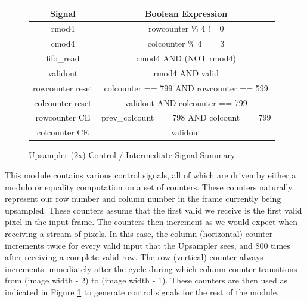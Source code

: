 \begin{figure}
    \centering
\tiny
\noindent \begin{tabular}{ c | c } \toprule
Signal & Boolean Expression \\\toprule
rmod4 & rowcounter \% 4 != 0 \\
cmod4 & colcounter \% 4 == 3 \\
fifo\_read & cmod4 AND (NOT rmod4) \\
validout & rmod4 AND valid \\
rowcounter reset & colcounter == 799 AND rowcounter == 599 \\
colcounter reset & validout AND colcounter == 799 \\
rowcounter CE & prev\_colcount == 798 AND colcount == 799 \\
colcounter CE & validout \\
\end{tabular}
\caption{ Upsampler (2x) Control / Intermediate Signal Summary } \label{fig:upsamplersignals}
\end{figure}

This module contains various control signals, all of which are driven by either
a modulo or equality computation on a set of counters. These counters naturally
represent our row number and column number in the frame currently being upsampled. 
These counters assume that the first valid we receive is the first valid pixel in the 
input frame. The counters then increment as we would expect when receiving a stream
of pixels. In this case, the column (horizontal) counter increments twice for
every valid input that the Upsampler sees, and 800 times after receiving a complete
valid row. The row (vertical) counter always increments immediately after the
cycle during which column counter transitions from (image width - 2) to (image width - 1).
These counters are then used as indicated in Figure \ref{fig:upsamplersignals} to generate control
signals for the rest of the module.


